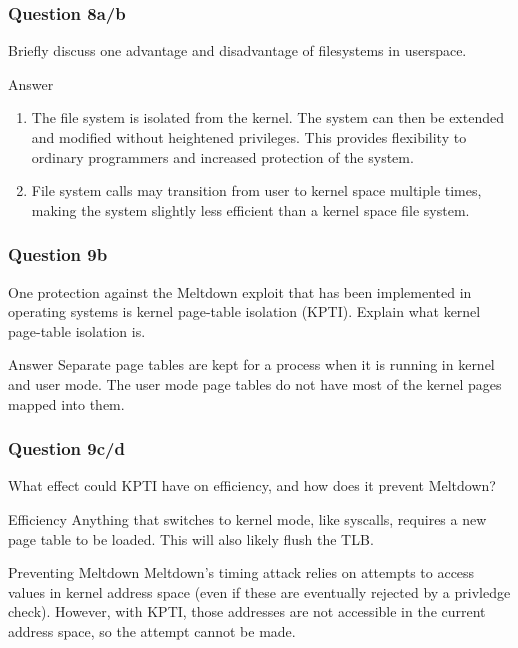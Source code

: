 \documentclass{beamer}
\begin{document}
\begin{frame}
  \frametitle{Question 8a/b}
  Briefly discuss one advantage and disadvantage of filesystems in userspace.
  \pause
  \begin{block}{Answer}
    \begin{enumerate}
      \item The file system is isolated from the kernel. The system can then be extended and modified without heightened privileges. This provides flexibility to ordinary programmers and increased protection of
      the system.
      \item File system calls may transition from user to kernel space multiple times, making the system slightly less efficient than a kernel space file system.
    \end{enumerate}
  \end{block}
\end{frame}
\begin{frame}
  \frametitle{Question 9b}
  One protection against the Meltdown exploit that has been implemented in operating systems is kernel page-table isolation (KPTI). Explain what kernel page-table isolation is.
  \pause
  \begin{block}{Answer}
    Separate page tables are kept for a process when it is running in kernel and user mode. The user mode page tables do not have most of the kernel pages mapped into them.
  \end{block}
\end{frame}
\begin{frame}
  \frametitle{Question 9c/d}
  What effect could KPTI have on efficiency, and how does it prevent Meltdown?
  \pause
  \begin{block}{Efficiency}
    Anything that switches to kernel mode, like syscalls, requires a new page table to be loaded. This will also likely flush the TLB.
  \end{block}
  \pause
  \begin{block}{Preventing Meltdown}
    Meltdown's timing attack relies on attempts to access values in kernel address space (even if these are eventually rejected by a privledge check). However, with KPTI, those addresses are not accessible in the current address space, so the attempt cannot be made.
  \end{block}
\end{frame}
\end{document}
